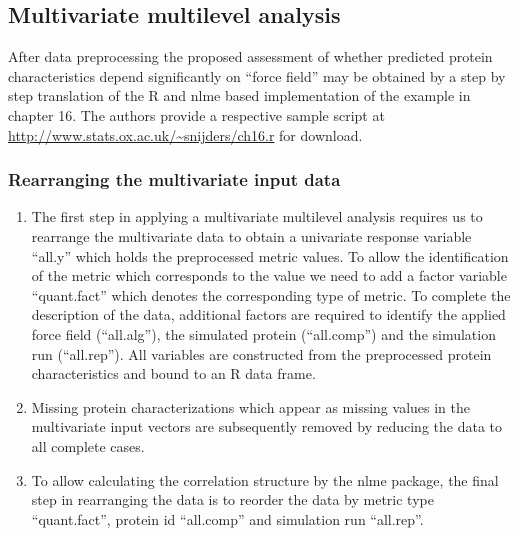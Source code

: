 \documentclass{article}\usepackage[table]{xcolor}
\renewcommand{\$}{$} %
\begin{document}
\subsection{Multivariate multilevel analysis}
After data preprocessing the proposed assessment of whether predicted
protein characteristics depend significantly on ``force field'' may be
obtained by a step by step translation of the R and nlme based
implementation of the example in \cite{Snijders+Bosker:2012} chapter
16. The authors provide a respective sample script at
\url{http://www.stats.ox.ac.uk/~snijders/ch16.r} for download.
\subsubsection{Rearranging the multivariate input data}
\begin{enumerate}
\item The first step in applying a multivariate multilevel analysis
  requires us to rearrange the multivariate data to obtain a univariate
  response variable ``all.y'' which holds the preprocessed metric
  values. To allow the identification of the metric which corresponds
  to the value we need to add a factor variable ``quant.fact'' which
  denotes the corresponding type of metric. To complete the
  description of the data, additional factors are required to identify
  the applied force field (``all.alg''), the simulated protein
  (``all.comp'') and the simulation run (``all.rep''). All variables
  are constructed from the preprocessed protein characteristics and
  bound to an R data frame.
\item Missing protein characterizations which appear as missing values
  in the multivariate input vectors are subsequently removed by
  reducing the data to all complete cases.
\item To allow calculating the correlation structure by the nlme
  package, the final step in rearranging the data is to reorder the
  data by metric type ``quant.fact'', protein id ``all.comp'' and
  simulation run ``all.rep''.
\end{enumerate}
\end{document}
